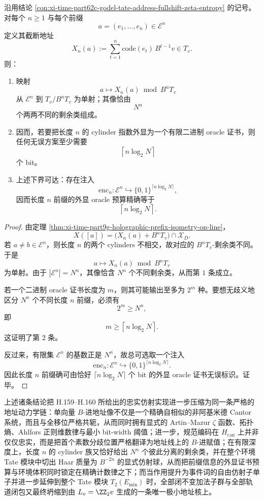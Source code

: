 \begin{conclusion}\label{con:xi-time-part62c-godel-tate-prefix-oracle-budget}
沿用结论 \ref{con:xi-time-part62c-godel-tate-address-fullshift-zeta-entropy} 的记号。对每个 \(n\ge 1\) 与每个前缀
\[
a=(e_1,\dots,e_n)\in\mathcal E^n
\]
定义其截断地址
\[
X_n(a):=\sum_{t=1}^{n}\mathrm{code}(e_t)\,B^{t-1}v\in T_v.
\]
则：
\begin{enumerate}
  \item 映射
  \[
  a\longmapsto X_n(a)\bmod B^nT_v
  \]
  从 \(\mathcal E^n\) 到 \(T_v/B^nT_v\) 为单射；其像恰由
  \[
  N^n
  \]
  个两两不同的剩余类组成。
  \item 因而，若要把长度 \(n\) 的 cylinder 指数外显为一个有限二进制 oracle 证书，则任何无误方案至少需要
  \[
  \left\lceil n\log_2N\right\rceil
  \]
  个 bit。
  \item 上述下界可达：存在注入
  \[
  \mathrm{enc}_n:\mathcal E^n\hookrightarrow \{0,1\}^{\lceil n\log_2N\rceil},
  \]
  因而长度 \(n\) 前缀的外显 oracle 预算精确等于
  \[
  \left\lceil n\log_2N\right\rceil .
  \]
\end{enumerate}
\end{conclusion}
\begin{proof}
由定理 \ref{thm:xi-time-part9g-holographic-prefix-isometry-on-line}，
\[
X([a])=\bigl(X_n(a)+B^nT_v\bigr)\cap \mathcal X_D.
\]
若 \(a\neq b\in\mathcal E^n\)，则长度 \(n\) 的两个 cylinders 不相交，故对应的 \(B^nT_v\)-剩余类不同。于是
\[
a\longmapsto X_n(a)\bmod B^nT_v
\]
为单射。由于 \(|\mathcal E^n|=N^n\)，其像恰含 \(N^n\) 个不同剩余类，从而第 \(1\) 条成立。

若一个二进制 oracle 证书长度为 \(m\)，则其可能输出至多为 \(2^m\) 种。要想无歧义地区分 \(N^n\) 个不同长度 \(n\) 前缀，必须有
\[
2^m\ge N^n,
\]
即
\[
m\ge \left\lceil n\log_2N\right\rceil.
\]
这证明了第 \(2\) 条。

反过来，有限集 \(\mathcal E^n\) 的基数正是 \(N^n\)，故总可选取一个注入
\[
\mathrm{enc}_n:\mathcal E^n\hookrightarrow \{0,1\}^{\lceil n\log_2N\rceil}.
\]
因此长度 \(n\) 前缀确可由恰好 \(\lceil n\log_2N\rceil\) 个 bit 的外显 oracle 证书无误标识。证毕。
\end{proof}




\noindent
上述诸条结论把 H.159--H.160 所给出的忠实仿射实现进一步压缩为同一条严格的地址动力学链：单向量 \(B\)-进地址像不仅是一个精确自相似的非阿基米德 Cantor 系统，而且与全移位严格共轭，从而同时拥有显式的 Artin--Mazur \(\zeta\) 函数、拓扑熵、Ahlfors 正则维数律与最小 bit-width 阈值；进一步，规范编码在 \(H_{\mathrm{can}}\) 上并非仅仅忠实，而是把首个素数分歧位置严格翻译为地址线上的 \(B\)-进赋值；在有限深度上，长度 \(n\) 的 cylinder 族又恰好给出 \(N^n\) 个彼此分离的剩余类，并在整个环境 Tate 模块中切出 Haar 质量为 \(B^{-2n}\) 的显式仿射球，从而把前缀信息的外显证书预算与环境体积同时锁定在精确计数律之下；而当作用提升为事件词的自由仿射子单子并进一步延伸到整个 Tate 模块 \(T_2(E_{\min})\) 时，全部闭不变加法子群与全部轨道闭包又最终坍缩到由 \(L_v=\ZZ_2v\) 生成的一条唯一极小地址核上。

\endinput
